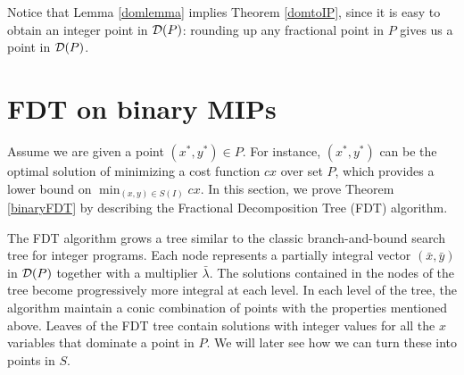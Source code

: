 	Notice that Lemma \ref{domlemma} implies Theorem \ref{domtoIP}, since it is easy to obtain an integer point in $\operatorname{\mathcal{D}}(P)$: rounding up any fractional point in $P$ gives us a point in $\operatorname{\mathcal{D}}(P)$.


\iffalse{
\begin{algorithm}[H]\label{FDTFull}
	\KwIn{$P= \{(x,y)\in \bbbr^{n\times p}: Ax+Gy\geq b\}$ and $S=\{(x,y)\in P: x\in \{0,1\}^n\}$ such that $g=\max_{c\in \bbbr^n_+ }\frac{\min_{(x,y)\in }cx}{\min_{(x,y)\in P}cx}$ is finite, $(x^*,y^*)\in P$}
	\KwOut{$(z^i,w^i)\in S$ and $\lambda_i\geq 0$ for $i=1,\ldots,k$ such that $\sum_{i=1}^{k}\lambda_i = 1$, and $\sum_{i=1}^{k}\lambda_iz^i\leq g^tx^*$ }
	$L^0\leftarrow [(x^*,y^*),1]$\\
	\For{$i=1$ \textbf{to} $t$}{
		$L'\leftarrow \emptyset$\\
		\For{$[(x,y),\lambda] \in L^i$}{
			Apply Lemma \ref{round-up} to obtain $[(\hat{x}^0,\hat{y}^0),\gamma_0]$ and $[(\hat{x}^1,\hat{y}^1),\gamma_1]$\\
			$L' \leftarrow L' \cup \{[(\hat{x}^0,\hat{y}^0),\gamma_0]\} \cup \{[(\hat{x}^1,\hat{y}^1),\gamma_1]\}$\\			
		}
		Apply Lemma \ref{prune} to $L'$ to obtain $L^{i+1}$. 
	}
	\For{$[(x,y),\lambda] \in L^t$}{
		Apply Algorithm \ref{domtoIP} to $(x,y)$ to obtain $(z,w)\in S$\\
		$F \leftarrow F \cup \{[(z,w),\lambda]\}$
	}
	\textbf{return} $F$
	\caption{Fractional Decomposition Tree Algorithm}
\end{algorithm}}\fi

\section{FDT on binary MIPs}
\label{binaryfdt}

Assume we are given a point $(x^*,y^*)\in P$. For instance, $(x^*,y^*)$ can be the optimal solution of minimizing a cost function $cx$ over set $P$, which provides a lower bound on $\min_{(x,y)\in S(I)} cx$.  In this section, we prove Theorem \ref{binaryFDT} by describing the Fractional Decomposition Tree (FDT) algorithm.
\iffalse{We also remark that if $g_I=1$, then the algorithm will give an exact decomposition of any feasible solution. }\fi


The FDT algorithm grows a tree similar to the classic branch-and-bound search tree for integer programs. Each node represents a partially integral vector $(\bar{x},\bar{y})$ in $\operatorname{\mathcal{D}}(P)$ together with a multiplier $\bar{\lambda}$. The solutions contained in the nodes of the tree become progressively more integral at each level. In each level of the tree, the algorithm maintain a conic combination of points with the properties mentioned above. Leaves of the FDT tree contain solutions with integer values for all the $x$ variables that dominate a point in $P$. We will later see how we can turn these into points in $S$. 


